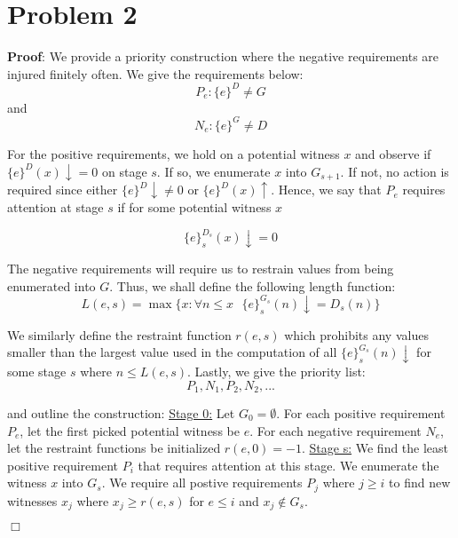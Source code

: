 \documentclass[11pt]{article}
\def\endproofmark{$\Box$}
\newenvironment{proof}{\par{\bf Proof}:}{\endproofmark\smallskip}
\begin{document}
\section*{Problem 2}
\begin{proof}
 We provide a priority construction where the negative requirements are injured finitely often. We give the requirements below:
 \begin{equation*} \label{posreq}
    P_e: \{e\}^D \neq G
 \end{equation*}
and 
\begin{equation*} \label{negreq}
    N_e: \{e\}^G \neq D
\end{equation*}

For the positive requirements, we hold on a potential witness $x$ and observe if $\{e\}^D(x) \downarrow = 0$ on stage $s$. If so, we enumerate $x$ into $G_{s+1}$. If not, no action is required since either $\{e\}^D\downarrow \neq 0$ or $\{e\}^D(x)\uparrow$.  
Hence, we say that $P_e$ requires attention at stage $s$ if for some potential witness $x$

\begin{equation*}
    \{e\}^{D_s}_s(x) \downarrow = 0
\end{equation*}

The negative requirements will require us to restrain values from being enumerated into $G$. Thus, we shall define the following length function:
\begin{equation*}
  L(e,s) = \max \{x: \forall n \leq x \text{ } \{e\}^{G_s}_s(n) \downarrow = D_s(n) \} 
\end{equation*}

We similarly define the restraint function $r(e,s)$ which prohibits any values smaller than the largest value used in the computation of all $\{e\}^{G_s}_s(n)\downarrow$ for some stage $s$ where $n \leq L(e,s)$.
Lastly, we give the priority list:
\begin{equation*}
 P_1, N_1, P_2, N_2, ...
\end{equation*}

and outline the construction: \newline \newline
\underline{Stage 0:} Let $G_0 = \emptyset$. For each positive requirement $P_e$, let the first picked potential witness be $e$. For each negative requirement $N_e$, let the restraint functions be initialized $r(e,0) = -1$. \newline
\underline{Stage s:} We find the least positive requirement $P_i$ that requires attention at this stage. We enumerate the witness $x$ into $G_s$. We require all postive requirements $P_j$ where $j \geq i$ to find new witnesses $x_j$ where 
$x_j \geq r(e,s)$ for $e \leq i$ and $x_j \not\in G_s$. \newline


\end{proof}
\end{document}
